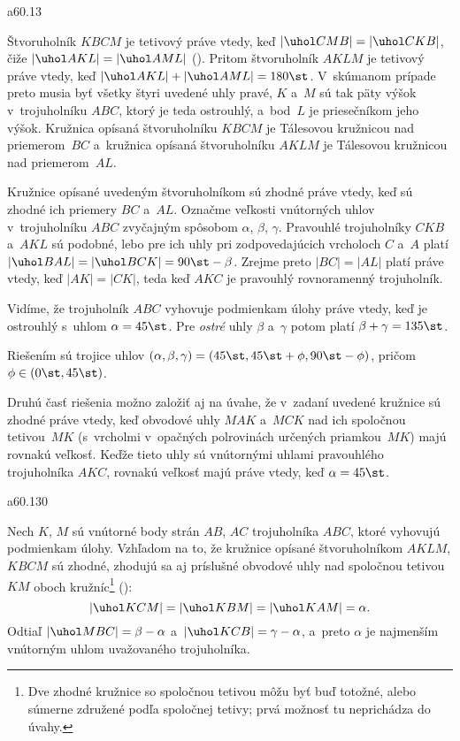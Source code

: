 {%
\epsplace a60.13 \hfil\Obr\par
Štvoruholník $KBCM$ je tetivový práve vtedy, keď
$|\uhol CMB|=|\uhol CKB|$, čiže $|\uhol AKL|=|\uhol AML|$ (\obr).
Pritom štvoruholník $AKLM$ je tetivový práve vtedy, keď $|\uhol AKL|+|\uhol AML|=180\st$.
V~skúmanom prípade preto musia byť všetky
štyri uvedené uhly pravé, $K$ a~$M$ sú tak päty výšok v~trojuholníku $ABC$, ktorý
je teda ostrouhlý, a~bod~$L$ je priesečníkom jeho výšok. Kružnica opísaná
štvoruholníku $KBCM$ je Tálesovou kružnicou nad priemerom~$BC$
a~kružnica opísaná štvoruholníku $AKLM$ je Tálesovou kružnicou nad
priemerom~$AL$.
\inspicture

Kružnice opísané uvedeným štvoruholníkom sú zhodné práve vtedy, keď
sú zhodné ich priemery $BC$ a~$AL$.
Označme veľkosti vnútorných uhlov v~trojuholníku $ABC$
zvyčajným spôsobom $\alpha$, $\beta$, $\gamma$.
Pravouhlé trojuholníky $CKB$ a~$AKL$ sú podobné, lebo
pre ich uhly pri zodpovedajúcich vrcholoch $C$ a~$A$ platí
$|\uhol BAL|=|\uhol BCK|=90\st-\beta$. Zrejme preto $|BC|=|AL|$ platí
práve vtedy, keď $|AK|=|CK|$, teda keď $AKC$ je pravouhlý rovnoramenný trojuholník.

Vidíme, že trojuholník $ABC$ vyhovuje podmienkam úlohy práve vtedy, keď je ostrouhlý
s~uhlom $\alpha=45\st$. Pre {\it ostré\/} uhly $\beta$ a~$\gamma$ potom platí $\beta+\gamma=135\st$.

\zaver
Riešením sú trojice uhlov $(\alpha,\beta,\gamma)=(45\st,45\st+\phi,90\st-\phi)$, pričom
$\phi\in(0\st,45\st)$.

\poznamka
Druhú časť riešenia možno založiť aj na úvahe, že v~zadaní uvedené kružnice sú zhodné práve vtedy, keď obvodové uhly $MAK$ a~$MCK$ nad ich spoločnou tetivou~$MK$ (s~vrcholmi v~opačných polrovinách určených priamkou~$MK$) majú rovnakú veľkosť. Keďže tieto uhly sú vnútornými uhlami pravouhlého trojuholníka $AKC$, rovnakú veľkosť majú práve vtedy, keď $\alpha=45\st$.

\ifrozsirenevzoraky
\epsplace a60.130 \hfil\Obr\par
\ineriesenie
Nech $K$, $M$ sú vnútorné body strán $AB$, $AC$ trojuholníka $ABC$, ktoré
vyhovujú podmienkam úlohy. Vzhľadom na to, že
kružnice opísané štvoruholníkom $AKLM$, $KBCM$ sú zhodné, zhodujú sa
aj príslušné obvodové uhly nad spoločnou tetivou~$KM$ oboch kružníc\footnote{Dve zhodné kružnice
so spoločnou tetivou môžu byť buď totožné, alebo súmerne združené podľa spoločnej tetivy;
prvá možnosť tu neprichádza do úvahy.} (\obr):
$$
|\uhol KCM|=|\uhol KBM|=|\uhol KAM|=\alpha.
$$
Odtiaľ $|\uhol MBC|=\beta-\alpha$ a~$|\uhol KCB|=\gamma-\alpha$, a~preto $\alpha$
je najmenším vnútorným uhlom uvažovaného trojuholníka.
\inspicture

}
